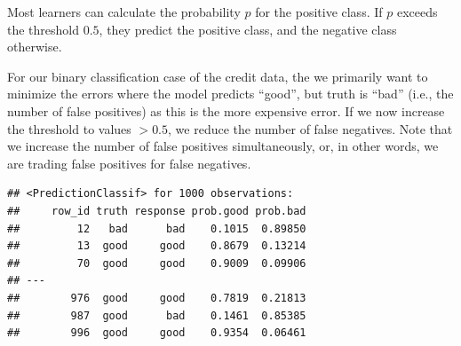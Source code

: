 \documentclass[]{scrbook}
\newenvironment{Shaded}{\begin{snugshade}}{\end{snugshade}}
\newcommand{\CommentTok}[1]{\textcolor[rgb]{0.56,0.35,0.01}{\textit{#1}}}
\newcommand{\ControlFlowTok}[1]{\textcolor[rgb]{0.13,0.29,0.53}{\textbf{#1}}}
\newcommand{\DataTypeTok}[1]{\textcolor[rgb]{0.13,0.29,0.53}{#1}}
\newcommand{\FloatTok}[1]{\textcolor[rgb]{0.00,0.00,0.81}{#1}}
\newcommand{\KeywordTok}[1]{\textcolor[rgb]{0.13,0.29,0.53}{\textbf{#1}}}
\newcommand{\NormalTok}[1]{#1}
\newcommand{\OperatorTok}[1]{\textcolor[rgb]{0.81,0.36,0.00}{\textbf{#1}}}
\newcommand{\StringTok}[1]{\textcolor[rgb]{0.31,0.60,0.02}{#1}}
\renewenvironment{Shaded} {\begin{snugshade}\small} {\end{snugshade}}
\begin{document}
Most learners can calculate the probability \(p\) for the positive class.
If \(p\) exceeds the threshold \(0.5\), they predict the positive class, and the negative class otherwise.

For our binary classification case of the credit data, the we primarily want to minimize the errors where the model predicts ``good'', but truth is ``bad'' (i.e., the number of false positives) as this is the more expensive error.
If we now increase the threshold to values \(> 0.5\), we reduce the number of false negatives.
Note that we increase the number of false positives simultaneously, or, in other words, we are trading false positives for false negatives.

\begin{Shaded}
\end{Shaded}

\begin{verbatim}
## <PredictionClassif> for 1000 observations:
##     row_id truth response prob.good prob.bad
##         12   bad      bad    0.1015  0.89850
##         13  good     good    0.8679  0.13214
##         70  good     good    0.9009  0.09906
## ---                                         
##        976  good     good    0.7819  0.21813
##        987  good      bad    0.1461  0.85385
##        996  good     good    0.9354  0.06461
\end{verbatim}

\begin{Shaded}
\end{Shaded}
\end{document}

